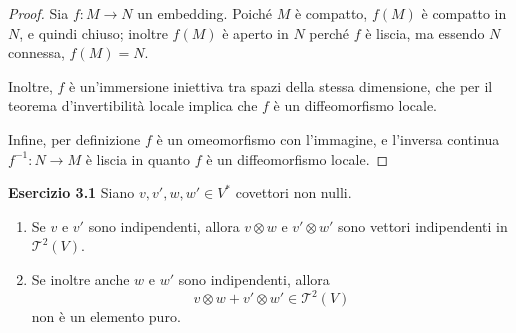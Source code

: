 \documentclass[a4paper]{article}
\theoremstyle{definition}
\theoremstyle{definition}
\theoremstyle{remark}
\theoremstyle{definition}
\begin{document}
\begin{proof}
    Sia $f:M\to N$ un embedding. Poiché $M$ è compatto, $f(M)$ è compatto in $N$, e quindi chiuso; inoltre $f(M)$ è aperto in $N$ perché $f$ è liscia, ma essendo $N$ connessa, $f(M) = N$.

    Inoltre, $f$ è un'immersione iniettiva tra spazi della stessa dimensione, che per il teorema d'invertibilità locale implica che $f$ è un diffeomorfismo locale.

    Infine, per definizione $f$ è un omeomorfismo con l'immagine, e l'inversa continua $f^{-1}: N \to M$ è liscia in quanto $f$ è un diffeomorfismo locale.
\end{proof}
\textbf{Esercizio 3.1}
Siano $v,v',w,w'\in V^*$ covettori non nulli.
\begin{enumerate}
    \item Se $v$ e $v'$ sono indipendenti, allora $v\otimes w$ e $v'\otimes w'$ sono vettori indipendenti in $\mathcal{T}^2(V)$.
    \item Se inoltre anche $w$ e $w'$ sono indipendenti, allora
        $$
        v\otimes w+v'\otimes w' \in \mathcal{T}^2(V)
        $$
        non è un elemento puro.
\end{enumerate}
\end{document}

